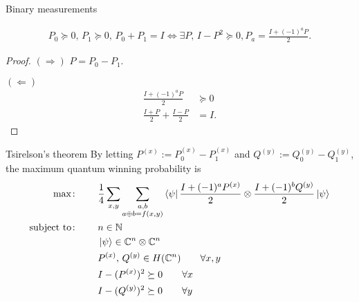 \documentclass{beamer}
\begin{document}
\begin{frame}{Binary measurements}
\begin{lemma}
\begin{align*}
P_0\succeq 0,\, P_1\succeq 0,\, P_0+P_1=I
\iff
\exists P,\, I - P^2 \succeq 0, 
P_a = \frac{I+(-1)^aP}2.
\end{align*}
\end{lemma}
\begin{proof}
$(\Rightarrow)$ $P=P_0-P_1$.

\vspace{1em}
$(\Leftarrow)$ 
\begin{align*}
\frac{I+(-1)^aP}2&\succeq 0\\
\frac{I+P}2 + \frac{I-P}2 &= I.
\end{align*}
\end{proof}
\end{frame}

\begin{frame}{Tsirelson's theorem}
By letting $P^{(x)} := P_0^{(x)} - P_1^{(x)}$ and $Q^{(y)} := Q_0^{(y)} - Q_1^{(y)}$,
the maximum quantum winning probability is
\begin{align*}
\max\colon\qquad& \frac14\sum_{x,y}\sum_{\substack{a,b\\ a\oplus b = f(x,y)}} \bra{\psi}\frac{I+(-1)^aP^{(x)}}2\otimes \frac{I+(-1)^b Q^{(y)}}2\ket{\psi}\\
\text{subject to}\colon\qquad&
n\in\mathbb{N}\\
&\ket{\psi} \in \mathbb{C}^n\otimes\mathbb{C}^n\\
&P^{(x)},\, Q^{(y)} \in H(\mathbb{C}^n)\qquad  \forall x,y\\
&I-(P^{(x)})^2\succeq 0\qquad \forall x\\
&I-(Q^{(y)})^2\succeq 0\qquad \forall y\\
\end{align*}
\end{frame}
\end{document}
